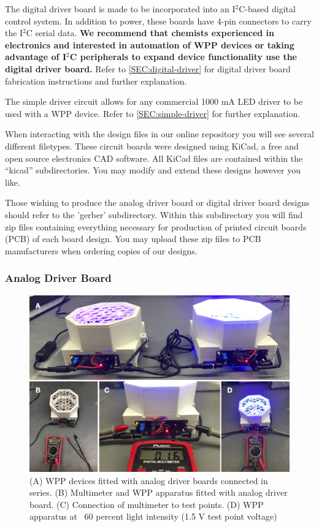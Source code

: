 \documentclass[11pt]{article}
\begin{document}
The digital driver board is made to be incorporated into an I$^2$C-based digital control system.
In addition to power, these boards have 4-pin connectors to carry the I$^2$C serial data.
\textbf{We recommend that chemists experienced in electronics and interested in automation of WPP devices or taking advantage of I$^2$C peripherals to expand device functionality use the digital driver board.}
Refer to \autoref{SEC:digital-driver} for digital driver board fabrication instructions and further explanation.

The simple driver circuit allows for any commercial 1000 mA LED driver to be used with a WPP device.
Refer to \autoref{SEC:simple-driver} for further explanation.

When interacting with the design files in our online repository you will see several different filetypes.
These circuit boards were designed using KiCad, a free and open source electronics CAD software.
All KiCad files are contained within the ``kicad'' subdirectories.
You may modify and extend these designs however you like.

Those wishing to produce the analog driver board or digital driver board designs should refer to the 'gerber' subdirectory.
Within this subdirectory you will find zip files containing everything necessary for production of printed circuit boards (PCB) of each board design.
You may upload these zip files to PCB manufacturers when ordering copies of our designs.

\clearpage
\subsubsection{Analog Driver Board} \label{SEC:analog-driver}

\begin{figure}[H]
	\centering
	\includegraphics[width=\textwidth]{"./fig11.png"}
	\caption{(A) WPP devices fitted with analog driver boards connected in series. (B) Multimeter and WPP apparatus fitted with analog driver board. (C) Connection of multimeter to test points. (D) WPP apparatus at ~60 percent light intensity (1.5 V test point voltage)}
\end{figure}
\end{document}
